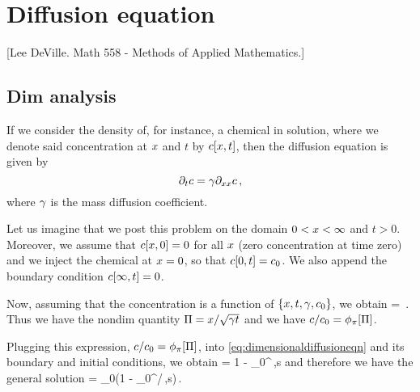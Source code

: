 \section{Diffusion equation}
%
\newcommand{\krcoeff}{\gamma} %


[Lee DeVille. Math 558 - Methods of Applied Mathematics.]


\subsection{Dim analysis}
If we consider the density of, for instance, a chemical in solution, where we denote said concentration at $x$ and $t$ by $c\!\left[{x, t}\right]$, then the diffusion equation is given by
\begin{equation}\label{eq:dimensionaldiffusioneqn}
\partial_{t}c = \gamma\partial_{xx}c\,,
\end{equation}
where $\gamma$ is the mass diffusion coefficient.

Let us imagine that we post this problem on the domain ${0}<{x}<{\infty}$ %
and $t > 0$. Moreover, we assume that $c\!\left[{x, 0}\right] = 0$ for all $x$ (zero concentration at time zero) and we inject the chemical at $x = 0$, so that $c\!\left[{0, t}\right] = c_0$. We also append the boundary condition $c\!\left[{\infty, t}\right] = 0$.

Now, assuming that the concentration is a function of $\left\lbrace{x, t, \gamma, c_0}\right\rbrace$, we obtain
\beq
{} = \kdimf{}\,.
\eeq
Thus we have the nondim quantity $\Pi = x/\sqrt{\gamma t}$ and we have $c/c_0 = \phi_{\pi}\!\left[{\Pi}\right]$.

Plugging this expression, $c/c_0 = \phi_{\pi}\!\left[{\Pi}\right]$, into \autoref{eq:dimensionaldiffusioneqn} and its boundary and initial conditions, we obtain
\beq
\kdimf\vat{\kdim} = 1 - \int_0^\kdim \exp{}\,,\dx s
\eeq
and therefore we have the general solution
\beq
\conc{} = \conc_0\left(1 - \int_0^{\lpos/}\exp{}\,,\dx s\right)\,.
\eeq


